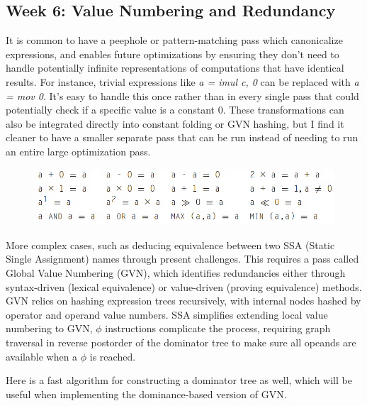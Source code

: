 \documentclass[11pt, a4paper, titlepage]{article}
\begin{document}
\subsection{Week 6: Value Numbering and Redundancy}

It is common to have a peephole or pattern-matching pass which canonicalize expressions, and enables future optimizations by ensuring they don't need to handle potentially infinite representations of computations that have identical results.
For instance, trivial expressions like \textit{a = imul c, 0} can be replaced with \textit{a = mov 0}.
It's easy to handle this once rather than in every single pass that could potentially check if a specific value is a constant $0$.
These transformations can also be integrated directly into constant folding or GVN hashing, but I find it cleaner to have a smaller separate pass that can be run instead of needing to run an entire large optimization pass. 

\begin{figure}[H]
  \centering
  \includegraphics[scale=0.4]{images/r10.png}
\end{figure}

More complex cases, such as deducing equivalence between two SSA (Static Single Assignment) names through present challenges.
This requires a pass called Global Value Numbering (GVN), which identifies redundancies either through syntax-driven (lexical equivalence) or value-driven (proving equivalence) methods.
GVN relies on hashing expression trees recursively, with internal nodes hashed by operator and operand value numbers.
SSA simplifies extending local value numbering to GVN, $\phi$ instructions complicate the process, requiring graph traversal in reverse postorder of the dominator tree to make sure all opeands are available when a $\phi$ is reached.

Here is a fast algorithm for constructing a dominator tree as well, which will be useful when implementing the dominance-based version of GVN.
\end{document}
